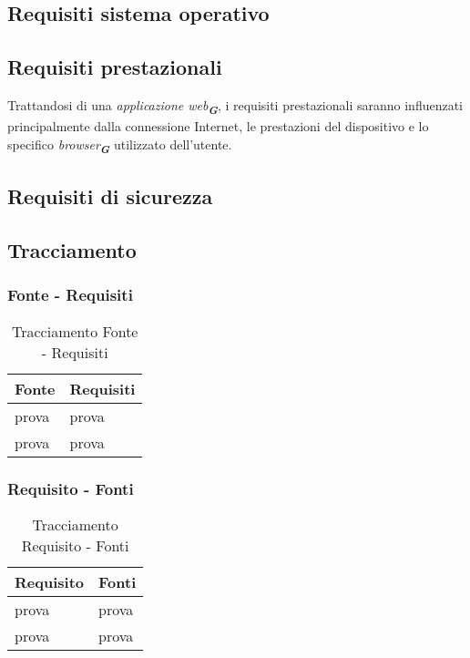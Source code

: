 \subsection{Requisiti sistema operativo}

\subsection{Requisiti prestazionali}
Trattandosi di una \emph{applicazione web}\textsubscript{\textit{\textbf{G}}}, i requisiti prestazionali saranno influenzati principalmente dalla connessione Internet, 
le prestazioni del dispositivo e lo specifico \emph{browser}\textsubscript{\textit{\textbf{G}}} utilizzato dell'utente.

\subsection{Requisiti di sicurezza}

\subsection{Tracciamento}

\subsubsection{Fonte - Requisiti}
\begin{table}[h!]
    \centering
    \renewcommand{\arraystretch}{1.6} %
    \begin{tabularx}{0.8\textwidth}{|>{\centering\arraybackslash}p{2.8cm}|>{\centering\arraybackslash}X|} \hline
    \rowcolor[HTML]{FFD700} 
    \textbf{Fonte} & \textbf{Requisiti} \\ \hline
    prova & prova \\ \hline
    prova & prova \\ \hline
    \end{tabularx}
    \caption{Tracciamento Fonte - Requisiti}
    \label{tab:Tracciamento_fonte_requisiti}
\end{table}


\subsubsection{Requisito - Fonti}
\begin{table}[h!]
    \centering
    \renewcommand{\arraystretch}{1.6} %
    \begin{tabularx}{0.8\textwidth}{|>{\centering\arraybackslash}p{2.8cm}|>{\centering\arraybackslash}X|} \hline
    \rowcolor[HTML]{FFD700} 
    \textbf{Requisito} & \textbf{Fonti} \\ \hline
    prova & prova \\ \hline
    prova & prova \\ \hline
    \end{tabularx}
    \caption{Tracciamento Requisito - Fonti}
    \label{tab:Tracciamento_requisiti_fonti}
\end{table}